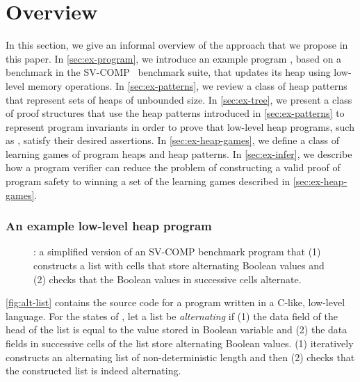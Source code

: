 \chapter{Overview}
\label{ch:overview}
In this section, we give an informal overview of the approach that we
propose in this paper.
%
In \autoref{sec:ex-program}, we introduce an example program \altlist,
based on a benchmark in the SV-COMP~\cite{sv-comp} benchmark suite,
that updates its heap using low-level memory operations.
%
In \autoref{sec:ex-patterns}, we review a class of heap patterns that
represent sets of heaps of unbounded size.
%
In \autoref{sec:ex-tree}, we present a class of proof structures that
use the heap patterns introduced in \autoref{sec:ex-patterns} to
represent program invariants in order to prove that low-level heap
programs, such as \altlist, satisfy their desired assertions.
%
In \autoref{sec:ex-heap-games}, we define a class of learning games of
program heaps and heap patterns.
%
In \autoref{sec:ex-infer}, we describe how a program verifier can
reduce the problem of constructing a valid proof of program safety to
winning a set of the learning games described in
\autoref{sec:ex-heap-games}.

\subsection{An example low-level heap program}
\label{sec:ex-program}
\begin{figure}
  \centering
  
  \caption{\altlist: a simplified version of an SV-COMP benchmark program that
    (1) constructs a list with cells that store alternating Boolean values
    and
    (2) checks that the Boolean values in successive cells alternate.
  }
  \label{fig:alt-list}
\end{figure}
\autoref{fig:alt-list} contains the source code for a program \altlist
written in a C-like, low-level language.
%
For the states of \altlist, let a list be \emph{alternating} if (1)
the data field of the head of the list is equal to the value stored in
Boolean variable \datavarnm and (2) the data fields in successive
cells of the list store alternating Boolean values.
%
\altlist (1) iteratively constructs an alternating list of
non-deterministic length and then
%
(2) checks that the constructed list is indeed alternating.

